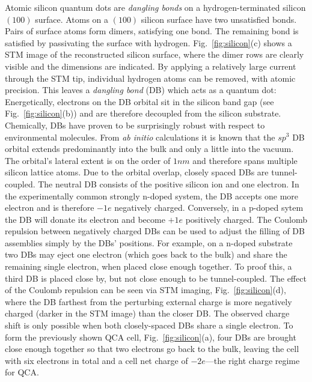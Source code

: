 Atomic silicon quantum dots are \emph{dangling bonds} on a hydrogen-terminated
silicon $(100)$ surface. Atoms on a $(100)$ silicon surface have two unsatisfied
bonds.  Pairs of surface atoms form dimers, satisfying one bond. The remaining
bond is satisfied by passivating the surface with hydrogen.
Fig.~\ref{fig:silicon}(c) shows a STM image of the reconstructed silicon
surface, where the dimer rows are clearly visible and the dimensions are
indicated. By applying a relatively large current through the STM tip,
individual hydrogen atoms can be removed, with atomic precision. This leaves a
\emph{dangling bond} (DB) which acts as a quantum dot: Energetically, electrons
on the DB orbital sit in the silicon band gap (see Fig.~\ref{fig:silicon}(b))
and are therefore decoupled from the silicon substrate. Chemically, DBs have
proven to be surprisingly robust with respect to environmental molecules. From
\emph{ab initio} calculations it is known that the $sp^3$ DB orbital extends
predominantly into the bulk and only a little into the vacuum. The orbital's
lateral extent is on the order of $1nm$ and therefore spans multiple silicon
lattice atoms. Due to the orbital overlap, closely spaced DBs are
tunnel-coupled. The neutral DB consists of the positive silicon ion and one
electron. In the experimentally common strongly n-doped system, the DB accepts
one more electron and is therefore $-1e$ negatively charged.  Conversely, in a
p-doped sytem the DB will donate its electron and become $+1e$ positively
charged. The Coulomb repulsion between negatively charged DBs can be used to
adjust the filling of DB assemblies simply by the DBs' positions. For example,
on a n-doped substrate two DBs may eject one electron (which goes back to the
bulk) and share the remaining single electron, when placed close enough
together. To proof this, a third DB is placed close by, but not close enough to
be tunnel-coupled. The effect of the Coulomb repulsion can be seen via STM
imaging, Fig.~\ref{fig:silicon}(d), where the DB farthest from the perturbing
external charge is more negatively charged (darker in the STM image) than the
closer DB. The observed charge shift is only possible when both closely-spaced
DBs share a single electron. To form the previously shown QCA cell,
Fig.~\ref{fig:silicon}(a), four DBs are brought close enough together so that
two electrons go back to the bulk, leaving the cell with six electrons in total
and a cell net charge of $-2e$---the right charge regime for QCA.

